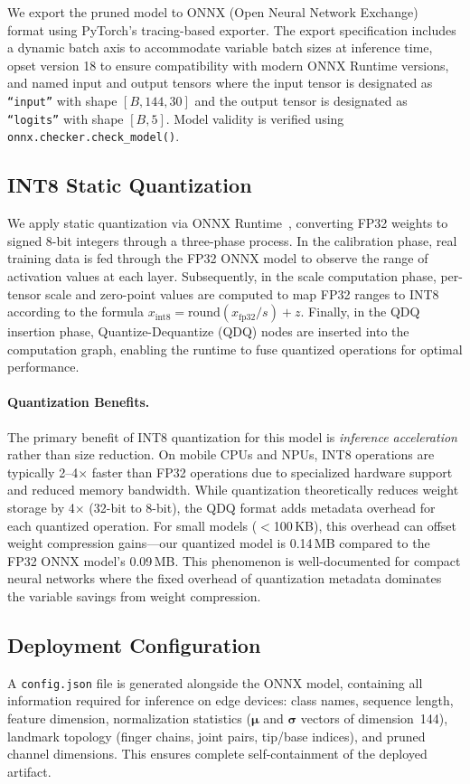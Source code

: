 We export the pruned model to ONNX (Open Neural Network
Exchange)~\cite{onnxruntime} format using PyTorch's tracing-based
exporter. The export specification includes a dynamic batch axis to accommodate variable batch sizes at inference time, opset version 18 to ensure compatibility with modern ONNX Runtime versions, and named input and output tensors where the input tensor is designated as \texttt{``input''} with shape $[B, 144, 30]$ and the output tensor is designated as \texttt{``logits''} with shape $[B, 5]$.
Model validity is verified using \texttt{onnx.checker.check\_model()}.

\subsection{INT8 Static Quantization}

We apply static quantization via ONNX
Runtime~\cite{jacob2018quantization}, converting FP32 weights to
signed 8-bit integers through a three-phase process. In the calibration phase, real training data is fed through the FP32 ONNX model to observe the range of activation values at each layer. Subsequently, in the scale computation phase, per-tensor scale and zero-point values are computed to map FP32 ranges to INT8 according to the formula $x_{\text{int8}} = \text{round}(x_{\text{fp32}} / s) + z$. Finally, in the QDQ insertion phase, Quantize-Dequantize (QDQ) nodes are inserted into the computation graph, enabling the runtime to fuse quantized operations for optimal performance.

\paragraph{Quantization Benefits.}
The primary benefit of INT8 quantization for this model is \emph{inference acceleration} rather than size reduction. On mobile CPUs and NPUs, INT8 operations are typically 2--4$\times$ faster than FP32 operations due to specialized hardware support and reduced memory bandwidth. While quantization theoretically reduces weight storage by 4$\times$ (32-bit to 8-bit), the QDQ format adds metadata overhead for each quantized operation. For small models ($<$100\,KB), this overhead can offset weight compression gains---our quantized model is 0.14\,MB compared to the FP32 ONNX model's 0.09\,MB. This phenomenon is well-documented for compact neural networks where the fixed overhead of quantization metadata dominates the variable savings from weight compression.

\subsection{Deployment Configuration}

A \texttt{config.json} file is generated alongside the ONNX model,
containing all information required for inference on edge devices:
class names, sequence length, feature dimension, normalization
statistics ($\boldsymbol\mu$ and $\boldsymbol\sigma$ vectors of
dimension~144), landmark topology (finger chains, joint pairs,
tip/base indices), and pruned channel dimensions. This ensures
complete self-containment of the deployed artifact.
